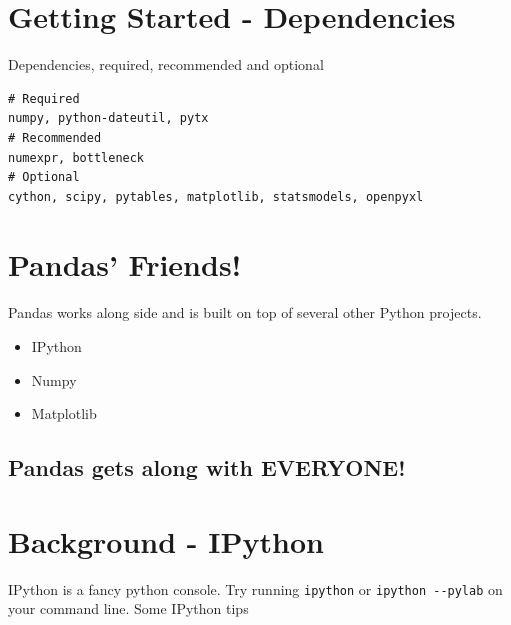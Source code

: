 \documentclass{article}
\newenvironment{Shaded}{}{}
\newcommand{\DataTypeTok}[1]{\textcolor[rgb]{0.56,0.13,0.00}{{#1}}}
\newcommand{\CommentTok}[1]{\textcolor[rgb]{0.38,0.63,0.69}{\textit{{#1}}}}
\newcommand{\NormalTok}[1]{{#1}}
\begin{document}
    \section{Getting Started -
Dependencies}\label{getting-started---dependencies}

Dependencies, required, recommended and optional

\begin{verbatim}
# Required
numpy, python-dateutil, pytx
# Recommended
numexpr, bottleneck
# Optional
cython, scipy, pytables, matplotlib, statsmodels, openpyxl
\end{verbatim}

    \section{Pandas' Friends!}\label{pandas-friends}

Pandas works along side and is built on top of several other Python
projects.

    \begin{itemize}
\itemsep1pt\parskip0pt
\item
  IPython
\end{itemize}

    \begin{itemize}
\itemsep1pt\parskip0pt
\item
  Numpy
\end{itemize}

    \begin{itemize}
\itemsep1pt\parskip0pt
\item
  Matplotlib
\end{itemize}

    \subsection{Pandas gets along with
EVERYONE!}\label{pandas-gets-along-with-everyone}

    \section{Background - IPython}\label{background---ipython}

IPython is a fancy python console. Try running \texttt{ipython} or
\texttt{ipython -{}-pylab} on your command line. Some IPython tips

\begin{Shaded}
\end{Shaded}
\end{document}
